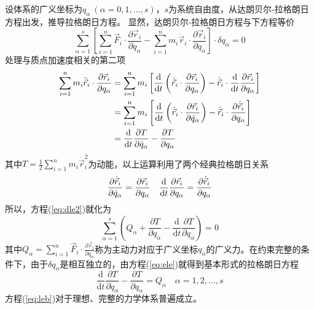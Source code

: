 \documentclass[a4paper,12pt,titlepage]{article}
\begin{document}
设体系的广义坐标为$q_\alpha~(\alpha=0,1,...,s)$，$s$为系统自由度，从达朗贝尔-拉格朗日方程出发，推导拉格朗日方程。
显然，达朗贝尔-拉格朗日方程与下方程等价
\begin{equation}
\label{eq:dle2}
	\sum_{\alpha=1}^s\left[\sum_{i=1}^n \vec{F}_i\cdot\frac{\partial \vec{r}_i}{\partial q_{\alpha}}-\sum_{i=1}^n m_i\ddot{\vec{r}}_i\cdot\frac{\partial \vec{r}_i}{\partial q_\alpha} \right]\cdot \delta q_\alpha=0
\end{equation}
处理与质点加速度相关的第二项
\begin{align}
	\sum_{i=1}^n m_i \ddot{\vec{r}}_i\cdot\frac{\partial \vec{r}_i}{\partial q_\alpha} &= \sum_{i=1}^n m_i\left[ \frac{\mathrm{d}}{\mathrm{d}t}\left(\dot{\vec{r}}_i\cdot\frac{\partial \vec{r}_i}{\partial q_\alpha} \right)-\dot{\vec{r}}_i\cdot\frac{\mathrm{d}}{\mathrm{d}t}\frac{\partial \vec{r}_i}{\partial q_\alpha} \right]\notag\\
	&=\sum_{i=1}^n m_i\left[ \frac{\mathrm{d}}{\mathrm{d}t}\left(\dot{\vec{r}}_i\cdot\frac{\partial \vec{r}_i}{\partial \dot{q}_\alpha} \right)-\dot{\vec{r}}_i\cdot\frac{\partial \dot{\vec{r}}_i}{\partial q_\alpha} \right]\notag\\
	&=\frac{\mathrm{d}}{\mathrm{d}t}\frac{\partial T}{\partial \dot{q}_\alpha}-\frac{\partial T}{\partial q_\alpha}
	\label{eq:mr}
\end{align}
其中$T=\frac{1}{2}\sum_{i=1}^n m_i\dot{\vec{r}}_i^2$为动能，以上运算利用了两个经典拉格朗日关系
\begin{equation}
	\frac{\partial \dot{\vec{r}}_i}{\partial \dot{q}_\alpha}=\frac{\partial \vec{r}_i}{\partial q_\alpha} \quad
	\frac{\mathrm{d}}{\mathrm{d}t}\frac{\partial \vec{r}_i}{\partial q_\alpha}=\frac{\partial \dot{\vec{r}}_i}{\partial q_\alpha} \notag
\end{equation}
所以，方程(\ref{eq:dle2})就化为
\begin{equation}
\label{eq:ele}
	\sum_{\alpha=1}^s\left( Q_\alpha+\frac{\partial T}{\partial {q}_\alpha}-\frac{\mathrm{d}}{\mathrm{d}t}\frac{\partial T}{\partial \dot{q}_\alpha} \right)=0
\end{equation}
其中$Q_\alpha=\sum_{i=1}^n \vec{F}_i\cdot\frac{\partial \vec{r}_i}{\partial q_{\alpha}}$称为主动力对应于广义坐标$q_\alpha$的广义力。在约束完整的条件下，由于$\delta q_\alpha$是相互独立的，由方程(\ref{eq:ele})就得到基本形式的拉格朗日方程
\begin{equation}
\label{eq:leb}
	\frac{\mathrm{d}}{\mathrm{d}t}\frac{\partial T}{\partial \dot{q}_\alpha}-\frac{\partial T}{\partial q_\alpha}=Q_\alpha\quad \alpha=1,2,...,s
\end{equation}
方程(\ref{eq:leb})对于理想、完整的力学体系普遍成立。
\end{document}
